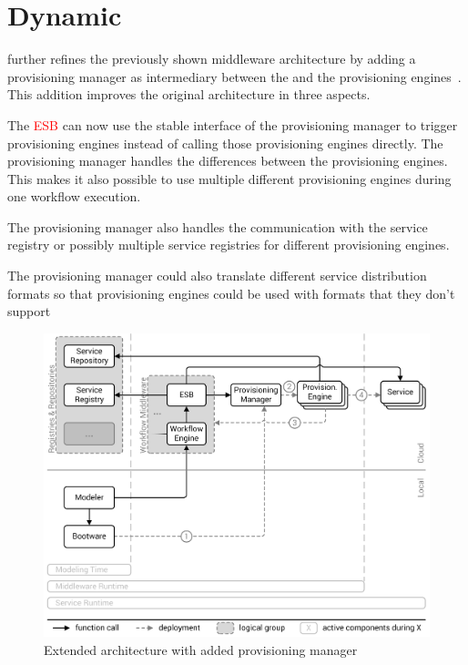 \section{Dynamic}
\label{related:dynamic}

\citeauthor{provisioning:dynamic} further refines the previously shown middleware architecture by adding a provisioning manager as intermediary between the  and the provisioning engines~\autocite{provisioning:dynamic}.
This addition improves the original architecture in three aspects.

The \textcolor{red}{ESB} can now use the stable interface of the provisioning manager to trigger provisioning engines instead of calling those provisioning engines directly.
The provisioning manager handles the differences between the provisioning engines.
This makes it also possible to use multiple different provisioning engines during one workflow execution.

The provisioning manager also handles the communication with the service registry or possibly multiple service registries for different provisioning engines.

The provisioning manager could also translate different service distribution formats so that provisioning engines could be used with formats that they don't support

\begin{figure}[!htbp]
	\centering
	\includegraphics[resolution=600]{related/assets/valeri_architecture}
	\caption{Extended architecture with added provisioning manager}
	\label{image:valeri_architecture}
\end{figure}

